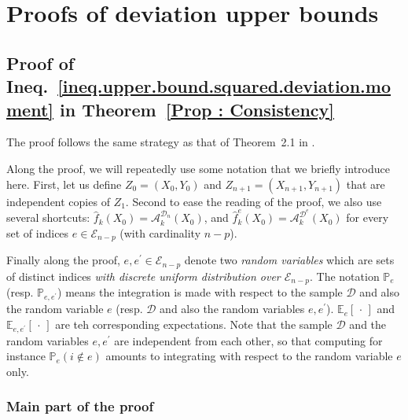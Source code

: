 \documentclass[twoside,11pt]{article}
\numberwithin{equation}{section}
\newcommand{\f}[1]{ \widehat{f}_k( #1 ) }
\newcommand{\fe}[1]{ \widehat{f}_k^e(#1 ) }
\newcommand{\1}{\mathds{1}}%
\newcommand{\paren}[1]{\left( #1 \right)}
\newcommand{\croch}[1]{\left[\, #1 \,\right]}
\newcommand{\E}{\mathbb{E}}
\renewcommand{\P}{\mathbb{P}}
\newcommand{\D}{\mathcal{D}}
\newcommand{\Dn}{\mathcal{D}_n}
\newcommand{\A}{\mathcal{A}}
\newcommand{\Enp}{\mathcal{E}_{n-p}}
\numberwithin{equation}{section}
\theoremstyle{plain}
\begin{document}




\newpage



\section{Proofs of deviation upper bounds}








\subsection{Proof of Ineq.~\eqref{ineq.upper.bound.squared.deviation.moment}  in Theorem~\ref{Prop : Consistency}}\label{appendix.proof.consistency}

The proof follows the same strategy as that of Theorem~2.1 in \cite{RogersWagner78}.

Along the proof, we will repeatedly use some notation that we briefly introduce here.
%
First, let us define $Z_0=(X_0,Y_0)$ and $Z_{n+1}=(X_{n+1},Y_{n+1})$ that are independent copies of $Z_1$.
%
Second to ease the reading of the proof, we also use several shortcuts: $\f{X_0} = \A_k^{\Dn}\paren{X_0}$, and $\fe{X_0} = \A_k^{\D^e}\paren{X_0}$ for every set of indices $e\in\Enp$ (with cardinality $n-p$).

Finally along the proof, $e,e^\prime \in \Enp$ denote two \emph{random variables} which are sets of distinct indices \emph{with discrete uniform distribution over $\Enp$}.
%
The notation $\P_e$ (resp. $\P_{e,e^\prime}$) means the integration is made with respect to the sample $\D$ and also the random variable $e$ (resp. $\D$ and also the random variables $e,e^\prime$). $\E_e\croch{\cdot}$ and $\E_{e,e^\prime}\croch{\cdot}$ are teh corresponding expectations.
%
Note that the sample $\D$ and the random variables $e,e^\prime$ are independent from each other, so that computing for instance $\P_e\paren{ i \not\in e}$ amounts to integrating with respect to the random variable $e$ only.

\subsubsection{Main part of the proof}\label{subsubsec.main.proof.combinatorial}
\end{document}
